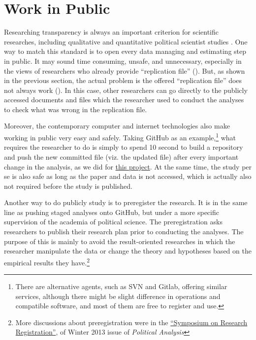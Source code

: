 
\section{Work in Public}

Researching transparency is always an important criterion for scientific researches, including qualitative and quantitative political scientist studies \citep{Appadurai2000,Denzin2009}. One way to match this standard is to open every data managing and estimating step in public. It may sound time consuming, unsafe, and unnecessary, especially in the views of researchers who already provide ``replication file'' (\cite[e.g., ][]{Newman2015}). But, as shown in the previous section, the actual problem is the offered ``replication file'' does not always work (\cite[e.g., again, ][]{Newman2015}). In this case, other researchers can go directly to the publicly accessed documents and files which the researcher used to conduct the analyses to check what was wrong in the replication file. 


Moreover, the contemporary computer and internet technologies also make working in public very easy and safely. Taking GitHub as an example,\footnote{There are alternative agents, such as SVN and Gitlab, offering similar services, although there might be slight difference in operations and compatible software, and most of them are free to register and use.} what requires the researcher to do is simply to spend 10 second to build a repository and push the new committed file (viz. the updated file) after every important change in the analysis, as we did for \href{https://github.com/fsolt/meritocracy-rep}{this project}. At the same time, the study per se is also safe as long as the paper and data is not accessed, which is actually also not required before the study is published. 

Another way to do publicly study is to preregister the research. It is in the same line as pushing staged analyses onto GitHub, but under a more specific supervision of the academia of political science. The preregistration asks researchers to publish their research plan prior to conducting the analyses. The purpose of this is mainly to avoid the result-oriented researches in which the researcher manipulate the data or change the theory and hypotheses based on the empirical results they have.\footnote{More discussions about preregistration were in the \href{http://pan.oxfordjournals.org/content/21/1.toc}{``Symposium on Research Registration''}, of Winter 2013 issue of \textit{Political Analysis}}


